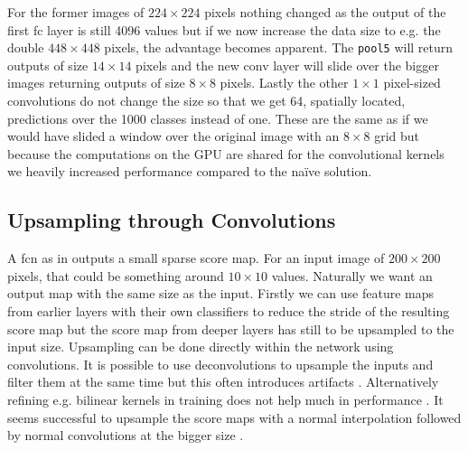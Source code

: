 For the former images of $224\times224$ pixels nothing changed as the output of the first \gls{fc} layer is still 4096 values but if we now increase the data size to e.g. the double $448\times448$ pixels, the advantage becomes apparent. The \texttt{pool5} will return outputs of size $14\times14$ pixels and the new \gls{conv} layer will slide over the bigger images returning outputs of size $8\times8$ pixels. Lastly the other $1\times1$ pixel-sized convolutions do not change the size so that we get 64, spatially located, predictions over the 1000 classes instead of one. These are the same as if we would have slided a window over the original image with an $8\times8$ grid but because the computations on the GPU are shared for the convolutional kernels we heavily increased performance compared to the naïve solution.

\subsection{Upsampling through Convolutions}
\label{sub:concepts:fcn:upsampling}
A \gls{fcn} as in \citep{long_fully_2015} outputs a small sparse score map. For an input image of $200\times 200$ pixels, that could be something around $10\times 10$ values. Naturally we want an output map with the same size as the input. Firstly we can use feature maps from earlier layers with their own classifiers to reduce the stride of the resulting score map but the score map from deeper layers has still to be upsampled to the input size. Upsampling can be done directly within the network using convolutions. It is possible to use deconvolutions to upsample the inputs and filter them at the same time but this often introduces artifacts \citep{odena_deconvolution_2016}. Alternatively refining e.g. bilinear kernels in training does not help much in performance \citep{shelhamer_fully_2016}. It seems successful to upsample the score maps with a normal interpolation followed by normal convolutions at the bigger size \citep{dong_image_2016}.

